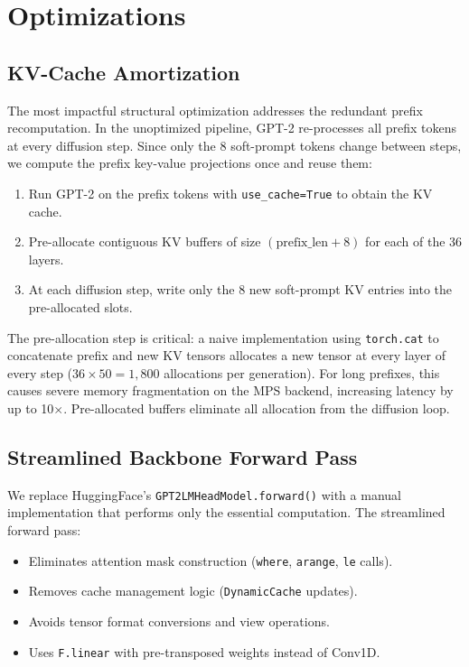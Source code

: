 \documentclass[sigconf,authordraft]{acmart}
\begin{document}
\section{Optimizations}

\subsection{KV-Cache Amortization}

The most impactful structural optimization addresses the redundant prefix recomputation. In the unoptimized pipeline, GPT-2 re-processes all prefix tokens at every diffusion step. Since only the 8 soft-prompt tokens change between steps, we compute the prefix key-value projections once and reuse them:

\begin{enumerate}
    \item Run GPT-2 on the prefix tokens with \texttt{use\_cache=True} to obtain the KV cache.
    \item Pre-allocate contiguous KV buffers of size $(\text{prefix\_len} + 8)$ for each of the 36 layers.
    \item At each diffusion step, write only the 8 new soft-prompt KV entries into the pre-allocated slots.
\end{enumerate}

The pre-allocation step is critical: a naive implementation using \texttt{torch.cat} to concatenate prefix and new KV tensors allocates a new tensor at every layer of every step ($36 \times 50 = 1{,}800$ allocations per generation). For long prefixes, this causes severe memory fragmentation on the MPS backend, increasing latency by up to 10$\times$. Pre-allocated buffers eliminate all allocation from the diffusion loop.

\subsection{Streamlined Backbone Forward Pass}

We replace HuggingFace's \texttt{GPT2LMHeadModel.forward()} with a manual implementation that performs only the essential computation. The streamlined forward pass:

\begin{itemize}
    \item Eliminates attention mask construction (\texttt{where}, \texttt{arange}, \texttt{le} calls).
    \item Removes cache management logic (\texttt{DynamicCache} updates).
    \item Avoids tensor format conversions and view operations.
    \item Uses \texttt{F.linear} with pre-transposed weights instead of Conv1D.
\end{itemize}
\end{document}
